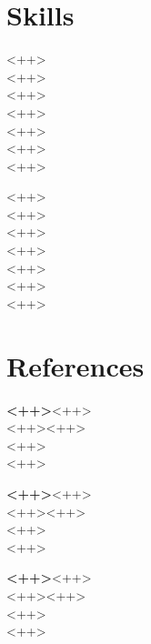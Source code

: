 \documentclass[letterpaper,11pt]{article}
\newcommand{\flstyle}{\textbf}
\newcommand{\slstyle}{\normalsize\textsc}
\newcommand{\locstyle}{\textnormal}
\newcommand{\refcon}[6]{
\begin{minipage}[t]{1\textwidth}
	\flstyle{#1}\hfill\locstyle{#2}\\
	\slstyle{#3}\hfill\locstyle{#4}\\
	\slstyle{#5}\\
	\slstyle{#6}
	\end{minipage}
}
\begin{document}
\section{Skills}%
\vspace{.7em}
\begin{minipage}[t]{.5\textwidth}\scshape
\begin{spacing}{1.2}
<++>\\
<++>\\
<++>\\
<++>\\
<++>\\
<++>\\
<++>\\
\end{spacing}
\end{minipage}\scshape
\begin{minipage}[t]{.5\textwidth}
\begin{spacing}{1.2}
<++>\\
<++>\\
<++>\\
<++>\\
<++>\\
<++>\\
<++>\\
\end{spacing}
\end{minipage}
\vspace{-0.8cm}
\vspace{1em}
\section{References}%
\vspace{1em}
\refcon
{<++>}%
{<++>}%
{<++>}%
{<++>}%
{<++>}%
{<++>}%

\refcon
{<++>}%
{<++>}%
{<++>}%
{<++>}%
{<++>}%
{<++>}%

\refcon
{<++>}%
{<++>}%
{<++>}%
{<++>}%
{<++>}%
{<++>}%
\end{document}
